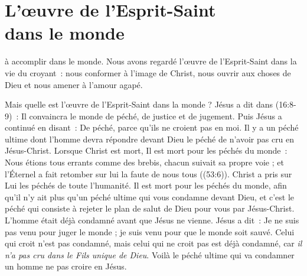 \chapter[L'\oe{}uvre de l'Esprit-Saint dans le monde]{L'\oe{}uvre de l'Esprit-Saint\\ dans le monde}

 à accomplir dans le monde.
 Nous avons regardé l'œuvre de l'Esprit-Saint dans la vie du croyant~:
 nous conformer à l'image de Christ, nous ouvrir aux choses de Dieu
 et nous amener à l'amour agapé.

Mais quelle est l'œuvre de l'Esprit-Saint dans la monde ?
 Jésus a dit dans (16:8-9)~:
 \og Il convaincra le monde de péché, de justice et de jugement. \fg{}
 Puis Jésus a continué en disant~:
 \og De péché, parce qu'ils ne croient pas en moi. \fg{}
 Il y a un péché ultime dont l'homme devra répondre devant Dieu
 \ocadr le péché de n'avoir pas cru en Jésus-Christ.
 Lorsque Christ est mort, Il est mort pour les péchés du monde~:
 \og Nous étions tous errants comme des brebis,
 chacun suivait sa propre voie ;
 et l'Éternel a fait retomber sur lui la faute de nous tous \fg{}
 ((53:6)).
 Christ a pris sur Lui les péchés de toute l'humanité.
 Il est mort pour les péchés du monde, afin qu'il n'y ait plus qu'un péché
 ultime qui vous condamne devant Dieu, et c'est le péché qui consiste
 à rejeter le plan de salut de Dieu pour vous par Jésus-Christ.
 L'homme était déjà condamné avant que Jésus ne vienne.
 Jésus a dit~: \og Je ne suis pas venu pour juger le monde ;
 je suis venu pour que le monde soit sauvé.
 Celui qui croit n'est pas condamné, mais celui qui ne croit pas
 est déjà condamné, car \emph{il n'a pas cru dans le Fils
 unique de Dieu}. \fg{}
 Voilà le péché ultime qui va condamner un homme
 \ocadr ne pas croire en Jésus.


